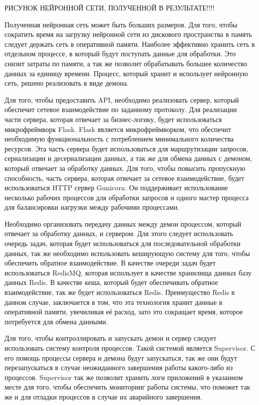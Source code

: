 РИСУНОК НЕЙРОННОЙ СЕТИ, ПОЛУЧЕННОЙ В РЕЗУЛЬТАТЕ!!!!

Полученная нейронная сеть может быть больших размеров. Для того, чтобы сократить время на загрузку нейронной сети из дискового пространства в память следует держать сеть в оперативной памяти. Наиболее эффективно хранить сеть в отдельном процессе, в который будут поступать данные для обработки. Это снизит затраты по памяти, а так же позволит обрабатывать большее количество данных за единицу времени. Процесс, который хранит и использует нейронную сеть, решено реализовать в виде демона.

Для того, чтобы предоставить API, необходимо реализовать сервер, который обеспечит сетевое взаимодействие по заданному протоколу. Для реализации части сервера, которая отвечает за бизнес-логику, будет использоваться микрофреймворк Flask. Flask является микрофреймворком, что обеспечит необходимую функциональность с потреблением минимального количества ресурсов. Эта часть сервера будет использоваться для маршрутизации запросов, сериализации и десериализации данных, а так же для обмена данных с демоном, который отвечает за обработку данных. Для того, чтобы повысить пропускную способность, часть сервера, которая отвечает за сетевое взаимодействие, будет использоваться HTTP сервер Gunicorn. Он поддерживает использование несколько рабочих процессов для обработки запросов и одного мастер процесса для балансировки нагрузки между рабочими процессами.

Необходимо организовать передачу данных между демон процессом, который отвечает за обработку данных, и сервером. Для этого следует использовать очередь задач, которая будет использоваться для последовательной обработки данных, так же необходимо использовать кеширующую систему для того, чтобы обеспечить обратное взаимодействие. В качестве очереди задач будет использоваться RedisMQ, которая использует в качестве хранилища данных базу данных Redis. В качестве кеша, который будет обеспечивать обратное взаимодействие, так же будет использоваться Redis. Преимущество Redis в данном случае, заключается в том, что эта технология хранит данные в оперативной памяти, увечиливая её расход, зато это сокращает время, которое потребуется для обмена данными.

Для того, чтобы контроллировать и запускать демон и сервер следует использовать систему контроля процессов. Такой системой является Supervisor. С его помощь процессы сервера и демона будут запускаться, так же они будут перезапускаться в случае неожиданного завершения работы какого-либо из процессов. Supervisor так же позволит хранить логи приложений в указанном месте для того, чтобы обеспечить мониторинг работы системы, что поможет так же и для отладки процессов в случае их аварийного завершения.

